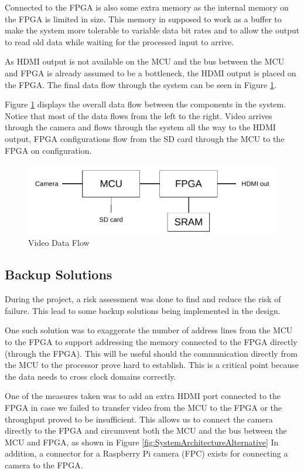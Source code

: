 Connected to the FPGA is also some extra memory as the internal memory on the FPGA is limited in size.
This memory in supposed to work as a buffer to make the system more tolerable to variable data bit rates and to allow the output to read old data while waiting for the processed input to arrive.

As HDMI output is not available on the MCU and the bus between the MCU and FPGA is already assumed to be a bottleneck, the HDMI output is placed on the FPGA.
The final data flow through the system can be seen in Figure \ref{fig:SystemArchitecture}.

Figure \ref{fig:SystemArchitecture} displays the overall data flow between the components in the system.
Notice that most of the data flows from the left to the right. Video arrives through the camera and flows through the system all the way to the HDMI output, FPGA configurations flow from the SD card through the MCU to the FPGA on configuration.

\begin{figure}
    \includegraphics{img/SystemArchitecture}
    \caption{Video Data Flow}
    \label{fig:SystemArchitecture}
\end{figure}

\subsection{Backup Solutions} \label{subsec:RiskAssessment}
During the project, a risk assessment was done to find and reduce the risk of failure.
This lead to some backup solutions being implemented in the design.

One such solution was to exaggerate the number of address lines from the MCU to the FPGA to support addressing the memory connected to the FPGA directly (through the FPGA).
This will be useful should the communication directly from the MCU to the processor prove hard to establish.
This is a critical point because the data needs to cross clock domains correctly.

One of the measures taken was to add an extra HDMI port connected to the FPGA in case we failed to transfer video from the MCU to the FPGA or the throughput proved to be insufficient.
This allows us to connect the camera directly to the FPGA and circumvent both the MCU and the bus between the MCU and FPGA, as shown in Figure \ref{fig:SystemArchitectureAlternative}
In addition, a connector for a Raspberry Pi camera (FPC) exists for connecting a camera to the FPGA.

